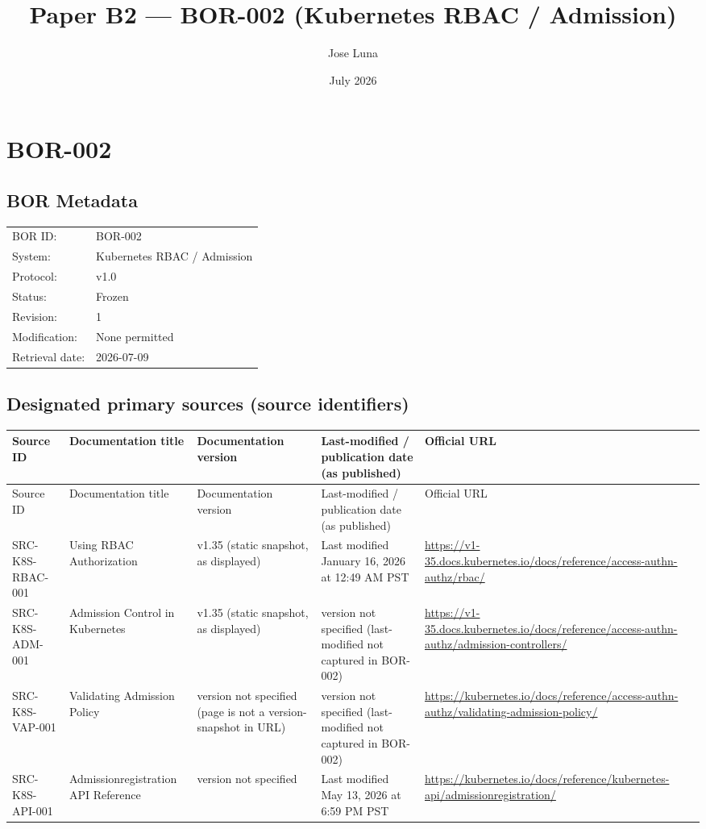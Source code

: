 \documentclass{article}
\title{Paper B2 --- BOR-002 (Kubernetes RBAC / Admission)}
\author{Jose Luna}
\date{July 2026}
\begin{document}
\maketitle

\section*{BOR-002}

\subsection*{BOR Metadata}
\begin{tabular}{@{}ll@{}}
\toprule
BOR ID: & BOR-002\\
System: & Kubernetes RBAC / Admission\\
Protocol: & v1.0\\
Status: & Frozen\\
Revision: & 1\\
Modification: & None permitted\\
Retrieval date: & 2026-07-09\\
\bottomrule
\end{tabular}

\subsection*{Designated primary sources (source identifiers)}
\begin{longtable}{@{}p{}p{}p{}p{}p{}@{}}
\toprule
Source ID & Documentation title & Documentation version & Last-modified / publication date (as published) & Official URL\\
\midrule
\endfirsthead
\toprule
Source ID & Documentation title & Documentation version & Last-modified / publication date (as published) & Official URL\\
\midrule
\endhead
SRC-K8S-RBAC-001 & Using RBAC Authorization & v1.35 (static snapshot, as displayed) & Last modified January 16, 2026 at 12:49 AM PST & \url{https://v1-35.docs.kubernetes.io/docs/reference/access-authn-authz/rbac/}\\
SRC-K8S-ADM-001 & Admission Control in Kubernetes & v1.35 (static snapshot, as displayed) & version not specified (last-modified not captured in BOR-002) & \url{https://v1-35.docs.kubernetes.io/docs/reference/access-authn-authz/admission-controllers/}\\
SRC-K8S-VAP-001 & Validating Admission Policy & version not specified (page is not a version-snapshot in URL) & version not specified (last-modified not captured in BOR-002) & \url{https://kubernetes.io/docs/reference/access-authn-authz/validating-admission-policy/}\\
SRC-K8S-API-001 & Admissionregistration API Reference & version not specified & Last modified May 13, 2026 at 6:59 PM PST & \url{https://kubernetes.io/docs/reference/kubernetes-api/admissionregistration/}\\
\bottomrule
\end{longtable}
\end{document}
